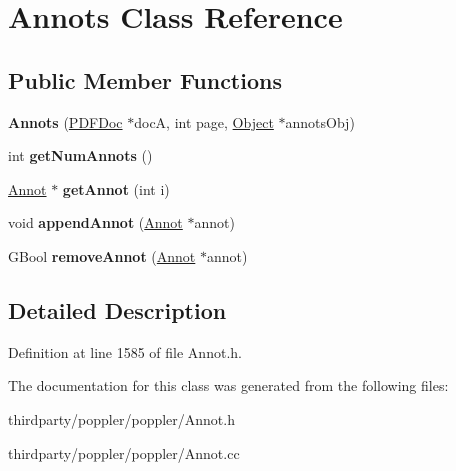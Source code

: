 \hypertarget{class_annots}{}\section{Annots Class Reference}
\label{class_annots}
\subsection*{Public Member Functions}
\begin{DoxyCompactItemize}
\item 
\mbox{\label{class_annots_a2a1f1deedfec66f6aa452447e099238c}} 
{\bfseries Annots} (\hyperlink{class_p_d_f_doc}{P\+D\+F\+Doc} $\ast$docA, int page, \hyperlink{class_object}{Object} $\ast$annots\+Obj)
\item 
\mbox{\label{class_annots_a03eabb14d576bad4207ef0e3d9812c5d}} 
int {\bfseries get\+Num\+Annots} ()
\item 
\mbox{\label{class_annots_a28e818eec8f3bf96d2dcf39dbae8552e}} 
\hyperlink{class_annot}{Annot} $\ast$ {\bfseries get\+Annot} (int i)
\item 
\mbox{\label{class_annots_ad2433436db591d5c3c7d7435b6100595}} 
void {\bfseries append\+Annot} (\hyperlink{class_annot}{Annot} $\ast$annot)
\item 
\mbox{\label{class_annots_a2cf1de870ae24d0c106962ec2470c3f1}} 
G\+Bool {\bfseries remove\+Annot} (\hyperlink{class_annot}{Annot} $\ast$annot)
\end{DoxyCompactItemize}


\subsection{Detailed Description}


Definition at line 1585 of file Annot.\+h.



The documentation for this class was generated from the following files\+:\begin{DoxyCompactItemize}
\item 
thirdparty/poppler/poppler/Annot.\+h\item 
thirdparty/poppler/poppler/Annot.\+cc\end{DoxyCompactItemize}
